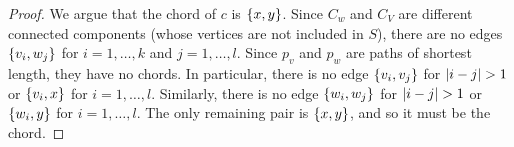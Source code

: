 \begin{proposition}
\begin{proof}
We argue that the chord of $c$ is $\{x, y\}$.
Since $C_w$ and $C_V$ are different connected components (whose vertices are not included in $S$), there are no edges $\{v_i, w_j\}$ for $i = 1, \dots, k$ and $j = 1, \dots, l$.
Since $p_v$ and $p_w$ are paths of shortest length, they have no chords.
In particular, there is no edge $\{v_i, v_j\}$ for $\left|i - j\right| > 1$ or $\{v_i, x\}$ for $i = 1, \dots, l$.
Similarly, there is no edge $\{w_i, w_j\}$ for $\left|i - j\right| > 1$ or $\{w_i, y\}$ for $i = 1, \dots, l$.
The only remaining pair is $\{x, y\}$, and so it must be the chord.
\end{proof}
\end{proposition}

